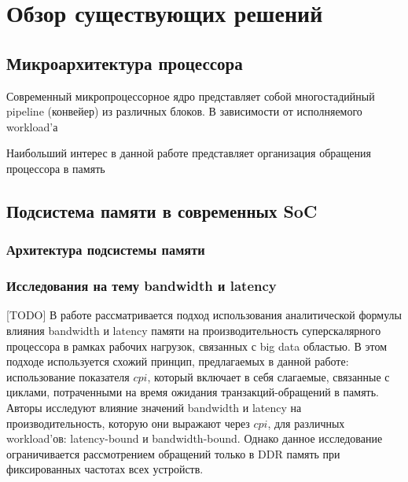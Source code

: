 \section{Обзор существующих решений}
\label{sec:Section2} 

\subsection{Микроархитектура процессора}

Современный микропроцессорное ядро представляет собой многостадийный pipeline (конвейер) из
различных блоков. В зависимости от исполняемого workload'а

Наибольший интерес в данной работе представляет организация обращения
процессора в память

\subsection{Подсистема памяти в современных SoC}
\subsubsection{Архитектура подсистемы памяти}

\subsubsection{Исследования на тему bandwidth и latency}

[TODO] В работе \cite{clapp2015quantifying} рассматривается подход использования аналитической
формулы влияния bandwidth и latency памяти на производительность суперскалярного
процессора в рамках рабочих нагрузок, связанных с big data областью. В этом подходе
используется схожий принцип, предлагаемых в данной работе: использование показателя
$cpi$, который включает в себя слагаемые, связанные с циклами, потраченными на время
ожидания транзакций-обращений в память. Авторы исследуют влияние значений bandwidth
и latency на производительность, которую они выражают через $cpi$, для различных workload'ов:
latency-bound и bandwidth-bound. Однако данное исследование ограничивается
рассмотрением обращений только в DDR память при фиксированных частотах всех устройств.

